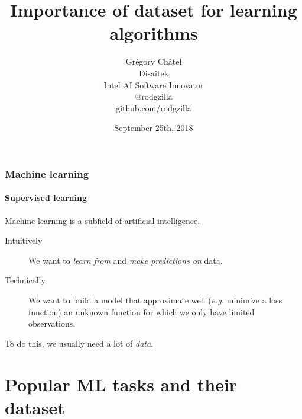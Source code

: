 \documentclass[10pt]{beamer}
\title{Importance of dataset for learning algorithms}
\author[G. Châtel]{Grégory Châtel\\\vspace{0.3cm}Disaitek\\Intel AI Software Innovator\\\vspace{0.3cm}@rodgzilla\\github.com/rodgzilla}
\date{September 25th, 2018}
\begin{document}
\begin{frame}

  \maketitle

\end{frame}

\begin{frame}

  \tableofcontents

\end{frame}

\begin{frame}

  \frametitle{Machine learning}

  \framesubtitle{Supervised learning}

  Machine learning is a subfield of artificial intelligence.

  \bigskip

  \begin{description}
    \item[Intuitively] We want to \emph{learn from} and \emph{make predictions
    on} data.

    \medskip

    \item[Technically] We want to build a model that approximate well
      (\textit{e.g.} minimize a loss function) an unknown function for
      which we only have limited observations.
  \end{description}

  \bigskip

  To do this, we usually need a lot of \emph{data}.

\end{frame}


\section{Popular ML tasks and their dataset}
\end{document}
